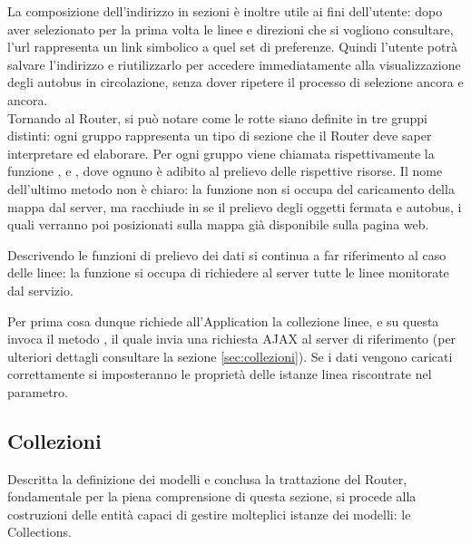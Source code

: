 La composizione dell'indirizzo in sezioni è inoltre utile ai fini dell'utente: dopo aver selezionato per la prima volta le linee e direzioni che si vogliono consultare, l'url rappresenta un link simbolico a quel set di preferenze. Quindi l'utente potrà salvare l'indirizzo e riutilizzarlo per accedere immediatamente alla visualizzazione degli autobus in circolazione, senza dover ripetere il processo di selezione ancora e ancora.\\

Tornando al Router, si può notare come le rotte siano definite in tre gruppi distinti: ogni gruppo rappresenta un tipo di sezione che il Router deve saper interpretare ed elaborare. Per ogni gruppo viene chiamata rispettivamente la funzione ,  e , dove ognuno è adibito al prelievo delle rispettive risorse. Il nome dell'ultimo metodo non è chiaro: la funzione non si occupa del caricamento della mappa dal server, ma racchiude in se il prelievo degli oggetti fermata e autobus, i quali verranno poi posizionati sulla mappa già disponibile sulla pagina web.

Descrivendo le funzioni di prelievo dei dati si continua a far riferimento al caso delle linee: la funzione  si occupa di richiedere al server tutte le linee monitorate dal servizio.

Per prima cosa dunque richiede all'Application la collezione linee, e su questa invoca il metodo , il quale invia una richiesta AJAX al server di riferimento (per ulteriori dettagli consultare la sezione \ref{sec:collezioni}). Se i dati vengono caricati correttamente si imposteranno le proprietà  delle istanze linea riscontrate nel parametro.

\subsection{Collezioni} %
\label{sub:collezioni}

Descritta la definizione dei modelli e conclusa la trattazione del Router, fondamentale per la piena comprensione di questa sezione, si procede alla costruzioni delle entità capaci di gestire molteplici istanze dei modelli: le Collections.

